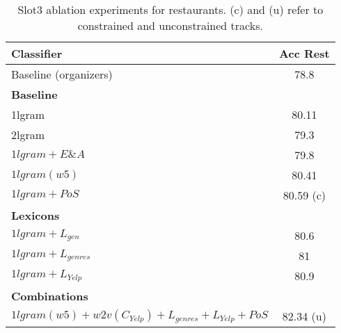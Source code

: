 \documentclass[11pt,letterpaper]{article}
\begin{document}
\begin{table} [ht]
\begin{center}
{\footnotesize
\setlength{\extrarowheight}{1pt}
\begin{tabular} {|@{\hspace{0.1cm}}p{}|c|}
\hline
 Classifier & Acc Rest \\ 
\hline
Baseline (organizers) & 78.8 \\ 
\hline
{\bf Baseline} & \\
\hspace{0.5cm}1lgram & 80.11 \\ 
\hspace{0.5cm}2lgram & 79.3 \\ 
\hline
$1lgram+E\&A$ & 79.8 \\ 
\hline
$1lgram(w5)$ & 80.41 \\ 
\hline
$1lgram+PoS$ & 80.59 (c) \\ 
\hline
{\bf Lexicons} & \\
\hspace{0.3cm}$1lgram+L_{gen}$ & 80.6 \\ 
\hspace{0.3cm}$1lgram+L_{genres}$ & 81 \\ 
\hspace{0.3cm}$1lgram+L_{Yelp}$ & 80.9 \\ 
\hline
{\bf Combinations} & \\
\hspace{0.3cm}$1lgram(w5)+w2v(C_{Yelp})+L_{genres}+L_{Yelp}+PoS$ & 82.34 (u)\\ 
\hline
\end{tabular}
}
\end{center}
\caption{Slot3 ablation experiments for restaurants. (c) and (u) refer to constrained and unconstrained tracks.}
\label{tab:ablatPolarity_rest}
\end{table}
\end{document}
